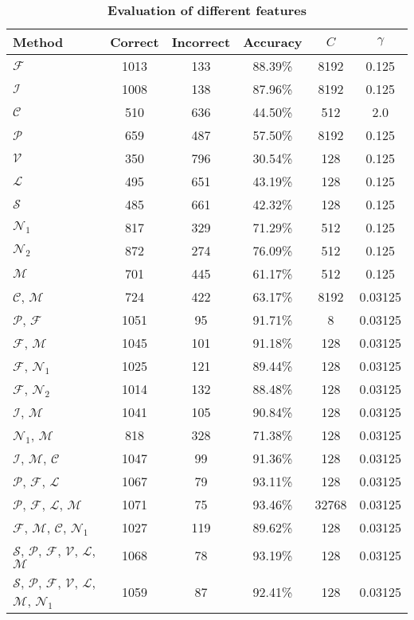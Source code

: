 \documentclass[11pt,english]{article}
\begin{document}
\begin{multicols}{2}
\begin{table*}
\begin{center}
\caption{\small \textbf{\textsf{Evaluation of different features}}}%
\begin{tabular}{l c c c c c}
\toprule
Method & Correct & Incorrect & Accuracy & $C$ & $\gamma$ \\
\midrule
$\mathcal{F}$ & 1013 & 133 & 88.39\% & 8192 & 0.125\\
$\mathcal{I}$ & 1008 & 138 & 87.96\% & 8192 & 0.125\\
$\mathcal{C}$ & 510 & 636 & 44.50\% & 512 & 2.0\\
$\mathcal{P}$ & 659 & 487 & 57.50\% & 8192 & 0.125\\
$\mathcal{V}$ & 350 & 796 & 30.54\% & 128 & 0.125\\
$\mathcal{L}$ & 495 & 651 & 43.19\% & 128 & 0.125\\
$\mathcal{S}$ & 485 & 661 & 42.32\% & 128 & 0.125\\
$\mathcal{N}_1$ & 817 & 329 & 71.29\% & 512 & 0.125\\
$\mathcal{N}_2$ & 872 & 274 & 76.09\% & 512 & 0.125\\
$\mathcal{M}$ & 701 & 445 & 61.17\% & 512 & 0.125\\
$\mathcal{C}$, $\mathcal{M}$ & 724 & 422 & 63.17\% & 8192 & 0.03125\\
$\mathcal{P}$, $\mathcal{F}$ & 1051 & 95 & 91.71\% & 8 & 0.03125\\
$\mathcal{F}$, $\mathcal{M}$ & 1045 & 101 & 91.18\% & 128 & 0.03125\\
$\mathcal{F}$, $\mathcal{N}_1$ & 1025 & 121 & 89.44\% & 128 & 0.03125\\
$\mathcal{F}$, $\mathcal{N}_2$ & 1014 & 132 & 88.48\% & 128 & 0.03125\\
$\mathcal{I}$, $\mathcal{M}$ & 1041 & 105 & 90.84\% & 128 & 0.03125\\
$\mathcal{N}_1$, $\mathcal{M}$ & 818 & 328 & 71.38\% & 128 & 0.03125\\
$\mathcal{I}$, $\mathcal{M}$, $\mathcal{C}$ & 1047 & 99 & 91.36\% & 128 & 0.03125\\
$\mathcal{P}$, $\mathcal{F}$, $\mathcal{L}$ & 1067 & 79 & 93.11\% & 128 & 0.03125\\
$\mathcal{P}$, $\mathcal{F}$, $\mathcal{L}$, $\mathcal{M}$ & 1071 & 75 & 93.46\% & 32768 & 0.03125\\
$\mathcal{F}$, $\mathcal{M}$, $\mathcal{C}$, $\mathcal{N}_1$ & 1027 & 119 & 89.62\% & 128 & 0.03125\\
$\mathcal{S}$, $\mathcal{P}$, $\mathcal{F}$, $\mathcal{V}$, $\mathcal{L}$, $\mathcal{M}$ & 1068 & 78 & 93.19\% & 128 & 0.03125\\
$\mathcal{S}$, $\mathcal{P}$, $\mathcal{F}$, $\mathcal{V}$, $\mathcal{L}$, $\mathcal{M}$, $\mathcal{N}_1$ & 1059 & 87 & 92.41\% & 128 & 0.03125\\
\bottomrule
\end{tabular}
\label{tbl:eval}%
\end{center}
\end{table*}%


\end{multicols}
\end{document}

